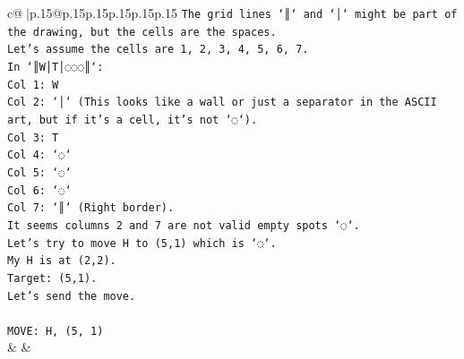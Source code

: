 \documentclass{article}
\begin{document}
{\begin{supertabular}{c@{$\;$}|p{.15\linewidth}@{}p{.15\linewidth}p{.15\linewidth}p{.15\linewidth}p{.15\linewidth}p{.15\linewidth}}
{{{\texttt{The grid lines `║` and `│` might be part of the drawing, but the cells are the spaces.} \\
\texttt{Let's assume the cells are 1, 2, 3, 4, 5, 6, 7.} \\
\texttt{In `║W│T│◌◌◌║`:} \\
\texttt{Col 1: W} \\
\texttt{Col 2: `│` (This looks like a wall or just a separator in the ASCII art, but if it's a cell, it's not `◌`).} \\
\texttt{Col 3: T} \\
\texttt{Col 4: `◌`} \\
\texttt{Col 5: `◌`} \\
\texttt{Col 6: `◌`} \\
\texttt{Col 7: `║` (Right border).} \\
\texttt{It seems columns 2 and 7 are not valid empty spots `◌`.} \\
\texttt{Let's try to move H to (5,1) which is `◌`.} \\
\texttt{My H is at (2,2).} \\
\texttt{Target: (5,1).} \\
\texttt{Let's send the move.} \\
\\ 
\texttt{MOVE: H, (5, 1)} \\
            }
        }
    }
    & & \\ \\


\end{supertabular}}
\end{document}
